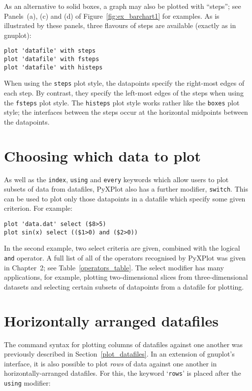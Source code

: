 As an alternative to solid boxes, a graph may also be plotted with ``steps'';
see Panels~(a), (c) and (d) of Figure~\ref{fig:ex_barchart1} for examples. As
is illustrated by these panels, three flavours of steps are available (exactly
as in gnuplot):

\begin{verbatim}
plot 'datafile' with steps 
plot 'datafile' with fsteps 
plot 'datafile' with histeps
\end{verbatim}

When using the \texttt{steps} plot style, the datapoints specify the right-most
edges of each step. By contrast, they specify the left-most edges of the steps
when using the \texttt{fsteps} plot style. The \texttt{histeps} plot style
works rather like the \texttt{boxes} plot style; the interfaces between the
steps occur at the horizontal midpoints between the datapoints.

\section{Choosing which data to plot}
\label{select_modifier} 
As well as the \texttt{index}, \texttt{using} and \texttt{every} keywords which
allow users to plot subsets of data from datafiles, PyXPlot also has a further
modifier, {\tt switch}. This can be used to
plot only those datapoints in a datafile which specify some given criterion. For
example:

\begin{verbatim}
plot 'data.dat' select ($8>5)
plot sin(x) select (($1>0) and ($2>0))
\end{verbatim}

In the second example, two select criteria are given, combined with the logical
{\tt and} operator. A full list of all of the operators recognised by PyXPlot
was given in Chapter~2; see Table~\ref{operators_table}.  The select modifier
has many applications, for example, plotting two-dimensional slices from
three-dimensional datasets and selecting certain subsets of datapoints from a
datafile for plotting.

\section{Horizontally arranged datafiles}

\label{horizontal_datafiles} 
The command syntax for plotting
columns of datafiles against one another was previously described in
Section~\ref{plot_datafiles}.  In an extension of gnuplot's interface, it is
also possible to plot \textit{rows} of data against one another in
horizontally-arranged datafiles.  For this, the keyword `\texttt{rows}' is
placed after the \texttt{using} modifier:

